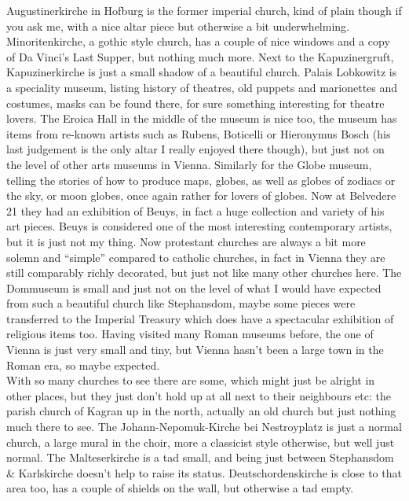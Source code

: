 Augustinerkirche in Hofburg is the former imperial church, kind of plain though if you ask me, with a nice altar piece but otherwise a bit underwhelming. Minoritenkirche, a gothic style church, has a couple of nice windows and a copy of Da Vinci's Last Supper, but nothing much more. Next to the Kapuzinergruft, Kapuzinerkirche is just a small shadow of a beautiful church. Palais Lobkowitz is a speciality museum, listing history of theatres, old puppets and marionettes and costumes, masks can be found there, for sure something interesting for theatre lovers. The Eroica Hall in the middle of the museum is nice too, the museum has items from re-known artists such as Rubens, Boticelli or Hieronymus Bosch (his last judgement is the only altar I really enjoyed there though), but just not on the level of other arts museums in Vienna. Similarly for the Globe museum, telling the stories of how to produce maps, globes, as well as globes of zodiacs or the sky, or moon globes, once again rather for lovers of globes. Now at Belvedere 21 they had an exhibition of Beuys, in fact a huge collection and variety of his art pieces. Beuys is considered one of the most interesting contemporary artists, but it is just not my thing. Now protestant churches are always a bit more solemn and ``simple'' compared to catholic churches, in fact in Vienna they are still comparably richly decorated, but just not like many other churches here. The Dommuseum is small and just not on the level of what I would have expected from such a beautiful church like Stephansdom, maybe some pieces were transferred to the Imperial Treasury which does have a spectacular exhibition of religious items too. Having visited many Roman museums before, the one of Vienna is just very small and tiny, but Vienna hasn't been a large town in the Roman era, so maybe expected.\\

With so many churches to see there are some, which might just be alright in other places, but they just don't hold up at all next to their neighbours etc: the parish church of Kagran up in the north, actually an old church but just nothing much there to see. The Johann-Nepomuk-Kirche bei Nestroyplatz is just a normal church, a large mural in the choir, more a classicist style otherwise, but well just normal. The Malteserkirche is a tad small, and being just between Stephansdom \& Karlskirche doesn't help to raise its status. Deutschordenskirche is close to that area too, has a couple of shields on the wall, but otherwise a tad empty.\\

